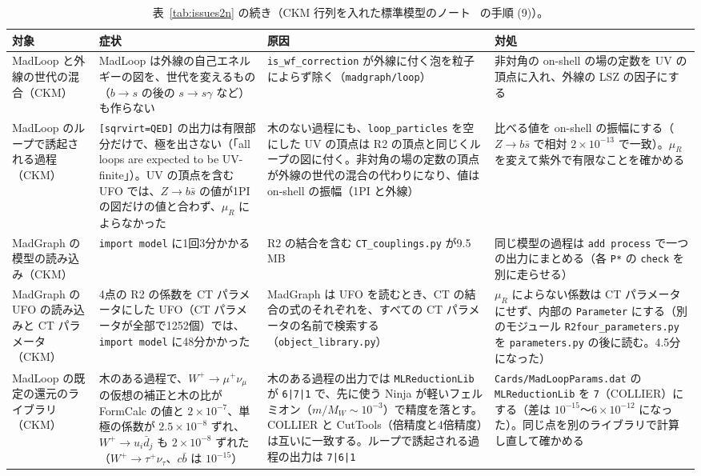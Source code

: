 \documentclass[a4paper,10pt]{ltjsarticle}
\begin{document}
\begin{table}[tbp]
\centering\footnotesize
\caption{表~\ref{tab:issues2n} の続き（CKM 行列を入れた標準模型のノート~\cite{smckmnote} の手順 (9)）。}
\label{tab:issues2o}
\begin{tabularx}{\linewidth}{>{\raggedright\arraybackslash}p{2.4cm}>{\raggedright\arraybackslash}X>{\raggedright\arraybackslash}X>{\raggedright\arraybackslash}X}
\toprule
\textbf{対象} & \textbf{症状} & \textbf{原因} & \textbf{対処} \\
\midrule
MadLoop と外線の世代の混合（CKM） & MadLoop は外線の自己エネルギーの図を、世代を変えるもの（$b\to s$ の後の $s\to s\gamma$ など）も作らない & \texttt{is\_wf\_correction} が外線に付く泡を粒子によらず除く（\texttt{madgraph/loop}） & 非対角の on-shell の場の定数を UV の頂点に入れ、外線の LSZ の因子にする \\
MadLoop のループで誘起される過程（CKM） & \texttt{[sqrvirt=QED]} の出力は有限部分だけで、極を出さない（「all loops are expected to be UV-finite」）。UV の頂点を含む UFO では、$Z\to b\bar s$ の値が1PI の図だけの値と合わず、$\mu_R$ によらなかった & 木のない過程にも、\texttt{loop\_particles} を空にした UV の頂点は R2 の頂点と同じくループの図に付く。非対角の場の定数の頂点が外線の世代の混合の代わりになり、値は on-shell の振幅（1PI と外線） & 比べる値を on-shell の振幅にする（$Z\to b\bar s$ で相対 $2\times10^{-13}$ で一致）。$\mu_R$ を変えて紫外で有限なことを確かめる \\
MadGraph の模型の読み込み（CKM） & \texttt{import model} に1回3分かかる & R2 の結合を含む \texttt{CT\_couplings.py} が9.5 MB & 同じ模型の過程は \texttt{add process} で一つの出力にまとめる（各 \texttt{P*} の \texttt{check} を別に走らせる） \\
MadGraph の UFO の読み込みと CT パラメータ（CKM） & 4点の R2 の係数を CT パラメータにした UFO（CT パラメータが全部で1252個）では、\texttt{import model} に48分かかった & MadGraph は UFO を読むとき、CT の結合の式のそれぞれを、すべての CT パラメータの名前で検索する（\texttt{object\_library.py}） & $\mu_R$ によらない係数は CT パラメータにせず、内部の \texttt{Parameter} にする（別のモジュール \texttt{R2four\_parameters.py} を \texttt{parameters.py} の後に読む。4.5分になった） \\
MadLoop の既定の還元のライブラリ（CKM） & 木のある過程で、$W^+\to\mu^+\nu_\mu$ の仮想の補正と木の比が FormCalc の値と $2\times10^{-7}$、単極の係数が $2.5\times10^{-8}$ ずれ、$W^+\to u_i\bar d_j$ も $2\times10^{-8}$ ずれた（$W^+\to\tau^+\nu_\tau$、$c\bar b$ は $10^{-15}$） & 木のある過程の出力では \texttt{MLReductionLib} が \texttt{6|7|1} で、先に使う Ninja が軽いフェルミオン（$m/M_W\sim10^{-3}$）で精度を落とす。COLLIER と CutTools（倍精度と4倍精度）は互いに一致する。ループで誘起される過程の出力は \texttt{7|6|1} & \texttt{Cards/MadLoopParams.dat} の \texttt{MLReductionLib} を \texttt{7}（COLLIER）にする（差は $10^{-15}$〜$6\times10^{-12}$ になった）。同じ点を別のライブラリで計算し直して確かめる \\

\end{tabularx}
\end{table}
\end{document}
